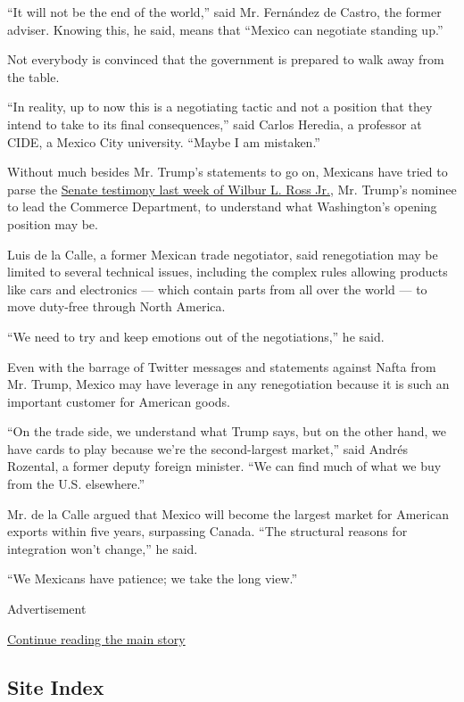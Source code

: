 ``It will not be the end of the world,'' said Mr. Fernández de Castro,
the former adviser. Knowing this, he said, means that ``Mexico can
negotiate standing up.''

Not everybody is convinced that the government is prepared to walk away
from the table.

``In reality, up to now this is a negotiating tactic and not a position
that they intend to take to its final consequences,'' said Carlos
Heredia, a professor at CIDE, a Mexico City university. ``Maybe I am
mistaken.''

Without much besides Mr. Trump's statements to go on, Mexicans have
tried to parse the
\href{https://www.nytimes.com/2017/01/18/us/politics/wilbur-ross-commerce-secretary-trump-trade-nafta.html}{Senate
testimony last week of Wilbur L. Ross Jr.}, Mr. Trump's nominee to lead
the Commerce Department, to understand what Washington's opening
position may be.

Luis de la Calle, a former Mexican trade negotiator, said renegotiation
may be limited to several technical issues, including the complex rules
allowing products like cars and electronics --- which contain parts from
all over the world --- to move duty-free through North America.

``We need to try and keep emotions out of the negotiations,'' he said.

Even with the barrage of Twitter messages and statements against Nafta
from Mr. Trump, Mexico may have leverage in any renegotiation because it
is such an important customer for American goods.

``On the trade side, we understand what Trump says, but on the other
hand, we have cards to play because we're the second-largest market,''
said Andrés Rozental, a former deputy foreign minister. ``We can find
much of what we buy from the U.S. elsewhere.''

Mr. de la Calle argued that Mexico will become the largest market for
American exports within five years, surpassing Canada. ``The structural
reasons for integration won't change,'' he said.

``We Mexicans have patience; we take the long view.''

Advertisement

\protect\hyperlink{after-bottom}{Continue reading the main story}

\hypertarget{site-index}{%
\subsection{Site Index}\label{site-index}}

